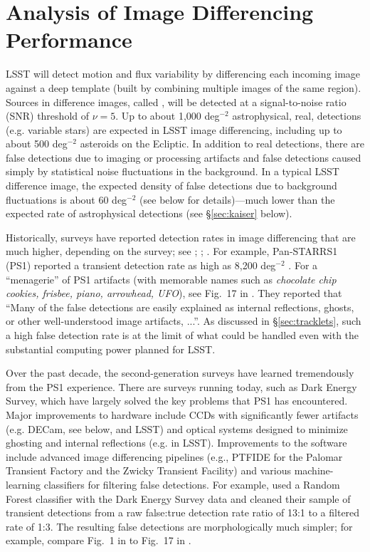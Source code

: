 \section{Analysis of Image Differencing Performance \label{sec:imDiff}}

LSST will detect motion and flux variability by differencing each incoming image
against a deep template (built by combining multiple images of the same region).
Sources in difference images, called \DIASources, will be detected at a signal-to-noise
ratio (SNR) threshold of $\nu=5$. Up to about 1,000 deg$^{-2}$
astrophysical, real, detections (e.g. variable stars) are expected in LSST image differencing, including
up to about 500 deg$^{-2}$ asteroids on the Ecliptic. In addition to real detections,
there are false detections due to imaging or processing artifacts and 
false detections caused simply by statistical noise
fluctuations in the background. In a typical LSST difference image, the expected
density of false detections due to background fluctuations is about 60 deg$^{-2}$
(see below for details)---much lower than the expected rate of astrophysical
detections (see \S\ref{sec:kaiser} below). 

Historically, surveys have reported detection rates in image differencing that are much
higher, depending on the survey; see \cite{denneau13}; \cite{kessler15}; \cite{goldstein15}.
For example, Pan-STARRS1 (PS1) reported a transient detection rate as high as 8,200 deg$^{-2}$
\citep{denneau13}. For a ``menagerie'' of PS1 artifacts (with memorable names such as
{\it chocolate chip cookies, frisbee, piano, arrowhead, UFO}), see Fig.~17 in \cite{denneau13}.
They reported that ``Many of the false detections are easily explained as internal reflections,
ghosts, or other well-understood image artifacts, ...''. As discussed in \S\ref{sec:tracklets},
such a high false detection rate is at the limit of what could be handled even
with the substantial computing power planned for LSST.

Over the past decade,
the second-generation surveys have learned tremendously from the PS1 experience. There are surveys
running today, such as Dark Energy Survey, which have largely solved the key problems that
PS1 has encountered. Major improvements to hardware include CCDs with significantly fewer
artifacts (e.g. DECam, see below, and LSST) and optical systems designed to minimize ghosting
and internal reflections (e.g. in LSST). Improvements to the software include advanced image
differencing pipelines (e.g., PTFIDE for the Palomar Transient Factory and the Zwicky Transient
Facility) and various machine-learning classifiers for filtering false detections. For example,
\cite{goldstein15} used a Random Forest classifier with the Dark Energy Survey data
and cleaned their sample of transient detections from a raw false:true detection
rate ratio of 13:1 to a filtered rate of 1:3. The resulting false detections are
morphologically much simpler; for example, compare
Fig.~1 in \cite{goldstein15} to Fig.~17 in \cite{denneau13}.

